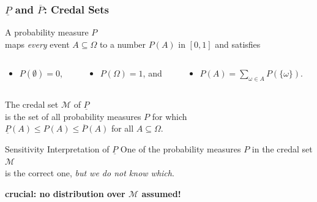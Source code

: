\documentclass{beamer}
\newcommand{\pr}{P}
\newcommand{\lpr}{\underline{P}}
\newcommand{\upr}{\overline{P}}
\begin{document}
\begin{frame}
  \frametitle{$\lpr$ and $\upr$: Credal Sets}
  \begin{definition}
    A \alert{probability measure} $\pr$
    \\
    maps
    \textit{every}
    event $A\subseteq\Omega$ to a number $\pr(A)$
    in $[0,1]$
    and satisfies
\begin{columns}
\begin{column}{0.2\textwidth}
    \begin{itemize}
    \item $\pr(\emptyset)=0$,
    \end{itemize}
\end{column}
\begin{column}{0.3\textwidth}
    \begin{itemize}
    \item $\pr(\Omega)=1$, and
    \end{itemize}
\end{column}
\begin{column}{0.45\textwidth}
    \begin{itemize}
    \item $\pr(A)=\sum_{\omega\in A}\pr(\{\omega\})$.
    \end{itemize}
\end{column}
\end{columns}
  \end{definition}
  \begin{definition}
    The \alert{credal set} $\mathcal{M}$
    of $\lpr$
    \\ is the set of all probability measures $\pr$ for which
    \\ 
    $\lpr(A)\le\pr(A)\le\upr(A)$ for all $A\subseteq\Omega$.
  \end{definition}
  \begin{block}{Sensitivity Interpretation of $\lpr$}
    One of the probability measures $\pr$ in the credal set $\mathcal{M}$\\
    is the correct one,
    \textit{but we do not know which}.
  \end{block}
    \textbf{crucial: no distribution over $\mathcal{M}$ assumed!} %
\end{frame}
\end{document}
